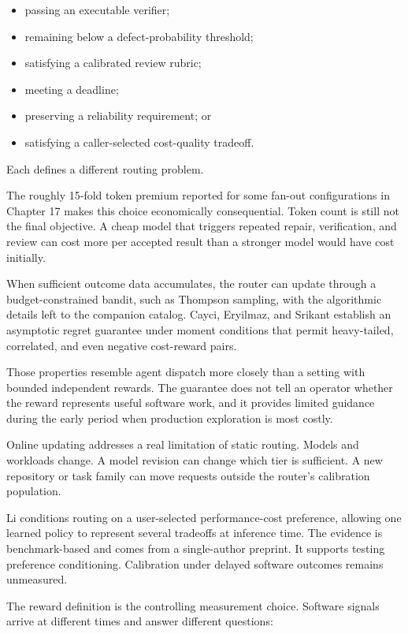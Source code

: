 \begin{itemize}
\tightlist
\item
  passing an executable verifier;
\item
  remaining below a defect-probability threshold;
\item
  satisfying a calibrated review rubric;
\item
  meeting a deadline;
\item
  preserving a reliability requirement; or
\item
  satisfying a caller-selected cost-quality tradeoff.
\end{itemize}

Each defines a different routing problem.

The roughly 15-fold token premium reported for some fan-out configurations in Chapter 17 makes this choice economically consequential. Token count is still not the final objective. A cheap model that triggers repeated repair, verification, and review can cost more per accepted result than a stronger model would have cost initially.

When sufficient outcome data accumulates, the router can update through a budget-constrained bandit, such as Thompson sampling, with the algorithmic details left to the companion catalog. Cayci, Eryilmaz, and Srikant establish an asymptotic regret guarantee under moment conditions that permit heavy-tailed, correlated, and even negative cost-reward pairs.

Those properties resemble agent dispatch more closely than a setting with bounded independent rewards. The guarantee does not tell an operator whether the reward represents useful software work, and it provides limited guidance during the early period when production exploration is most costly.

Online updating addresses a real limitation of static routing. Models and workloads change. A model revision can change which tier is sufficient. A new repository or task family can move requests outside the router's calibration population.

Li conditions routing on a user-selected performance-cost preference, allowing one learned policy to represent several tradeoffs at inference time. The evidence is benchmark-based and comes from a single-author preprint. It supports testing preference conditioning. Calibration under delayed software outcomes remains unmeasured.


The reward definition is the controlling measurement choice. Software signals arrive at different times and answer different questions:

